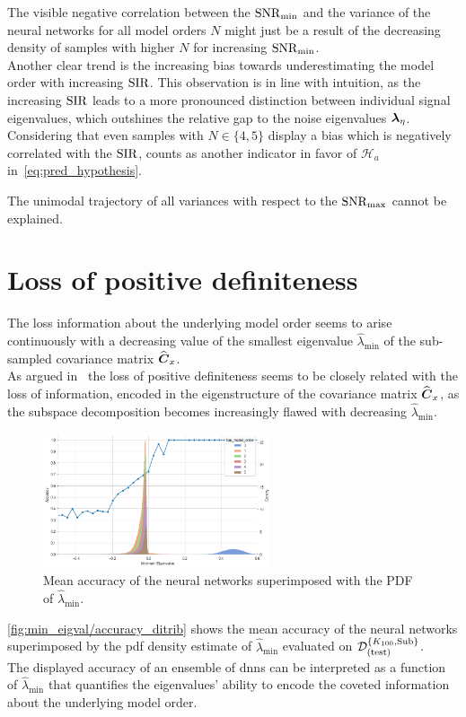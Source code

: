 The visible negative correlation between the \( \mathrm{SNR}_{\min} \) and the variance of the neural networks for all model orders \( N \)
might just be a result of the decreasing density of samples with higher \( N \) for increasing \( \mathrm{SNR}_{\min} \). \\

Another clear trend is the increasing bias towards underestimating the model order with increasing \( \mathrm{SIR} \).
This observation is in line with intuition, as the increasing \( \mathrm{SIR} \) leads to a more pronounced distinction between
individual signal eigenvalues, which outshines the relative gap to the noise eigenvalues \( \boldsymbol{\lambda}_{\eta} \).
Considering that even samples with \( N \in \{4,5\} \) display a bias which is negatively correlated with the \( \mathrm{SIR} \), counts as
another indicator in favor of \( \mathcal{H}_a \) in~\autoref{eq:pred_hypothesis}.

The unimodal trajectory of all variances with respect to the \( \mathrm{SNR}_{\max} \) cannot be explained.


\section{Loss of positive definiteness}
The loss information about the underlying model order seems to arise continuously with a decreasing value of the smallest
eigenvalue \( \widehat{\lambda}_{\min} \) of the sub-sampled covariance matrix \( \widehat{\boldsymbol{C}}_x \). \\
As argued in~\cite{barthelme21sub} the loss of positive definiteness seems to be closely related with the loss of information,
encoded in the eigenstructure of the covariance matrix \( \widehat{\boldsymbol{C}}_x \), as the subspace decomposition becomes increasingly flawed
with decreasing \( \widehat{\lambda}_{\min} \).

\begin{figure}[H]
    \centering
    \includegraphics[width=0.6\textwidth]{figures/07_Evaluation/min_eigval/accuracy_ditrib.png}
    \caption{Mean accuracy of the neural networks superimposed with the PDF of \( \widehat{\lambda}_{\min} \).}
    \label{fig:min_eigval/accuracy_ditrib}
\end{figure}
\autoref{fig:min_eigval/accuracy_ditrib} shows the mean accuracy of the neural networks superimposed by the \gls{pdf} density
estimate of \( \widehat{\lambda}_{\min} \) evaluated on \( \mathcal{D}^{\{K_{100},\text{Sub}\}}_{(\text{test})} \). \\
The displayed accuracy of an ensemble of \glspl{dnn} can be interpreted as a function of \( \widehat{\lambda}_{\min} \) that
quantifies the eigenvalues' ability to encode the coveted information about the underlying model order. \\

